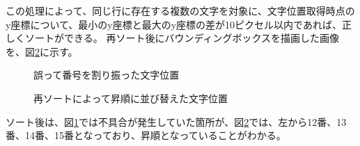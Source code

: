 この処理によって、同じ行に存在する複数の文字を対象に、文字位置取得時点のy座標について、最小のy座標と最大のy座標の差が10ピクセル以内であれば、正しくソートができる。
再ソート後にバウンディングボックスを描画した画像を、図\ref{fig:after_sorted_string}に示す。
\begin{figure}[tp]
    \begin{center}
        \caption{誤って番号を割り振った文字位置}
        \label{fig:before_sorted_string}
    \end{center}
\end{figure}
\begin{figure}[tp]
    \begin{center}
        \caption{再ソートによって昇順に並び替えた文字位置}
        \label{fig:after_sorted_string}
    \end{center}
\end{figure}
ソート後は、図\ref{fig:before_sorted_string}では不具合が発生していた箇所が、図\ref{fig:after_sorted_string}では、左から12番、13番、14番、15番となっており、昇順となっていることがわかる。


